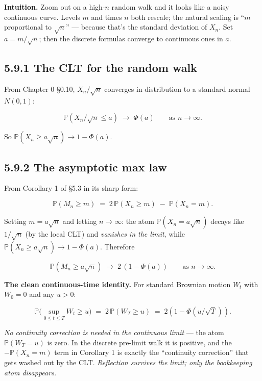 \documentclass[
  10pt,
  twoside]{book}
\begin{document}
\textbf{Intuition.} Zoom out on a high-\(n\) random walk and it looks
like a noisy continuous curve. Levels \(m\) and times \(n\) both
rescale; the natural scaling is ``\(m\) proportional to \(\sqrt n\)''
--- because that's the standard deviation of \(X_n\). Set
\(a = m/\sqrt n\); then the discrete formulas converge to continuous
ones in \(a\).

\subsection{5.9.1 The CLT for the random
walk}\label{the-clt-for-the-random-walk}

From Chapter 0 §0.10, \(X_n / \sqrt n\) converges in distribution to a
standard normal \(N(0, 1)\):

\[\mathbb P(X_n / \sqrt n \le a) \;\to\; \Phi(a) \qquad \text{as } n \to \infty.\]

So \(\mathbb P(X_n \ge a\sqrt n) \to 1 - \Phi(a)\).

\subsection{5.9.2 The asymptotic max law}\label{the-asymptotic-max-law}

From Corollary 1 of §5.3 in its sharp form:

\[\mathbb P(M_n \ge m) \;=\; 2\,\mathbb P(X_n \ge m) \;-\; \mathbb P(X_n = m).\]

Setting \(m = a\sqrt n\) and letting \(n \to \infty\): the atom
\(\mathbb P(X_n = a\sqrt n)\) decays like \(1/\sqrt n\) (by the local
CLT) and \emph{vanishes in the limit}, while
\(\mathbb P(X_n \ge a\sqrt n) \to 1 - \Phi(a)\). Therefore

\[\boxed{\;\mathbb P(M_n \ge a\sqrt n) \;\longrightarrow\; 2\,(1 - \Phi(a)) \qquad \text{as } n \to \infty.\;}\]

\textbf{The clean continuous-time identity.} For standard Brownian
motion \(W_t\) with \(W_0 = 0\) and any \(u > 0\):

\[\mathbb P\bigl(\sup_{0 \le t \le T} W_t \ge u\bigr) \;=\; 2\,\mathbb P(W_T \ge u) \;=\; 2(1 - \Phi(u/\sqrt T)).\]

\emph{No continuity correction is needed in the continuous limit} ---
the atom \(\mathbb P(W_T = u)\) is zero. In the discrete pre-limit walk
it is positive, and the \(-\mathbb P(X_n = m)\) term in Corollary 1 is
exactly the ``continuity correction'' that gets washed out by the CLT.
\emph{Reflection survives the limit; only the bookkeeping atom
disappears.}
\end{document}
